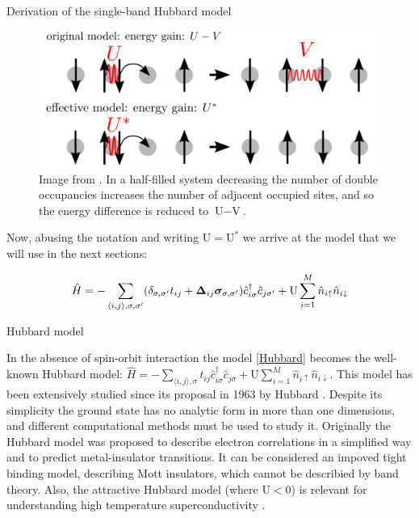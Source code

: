 \begin{section}{Derivation of the single-band Hubbard model}
\begin{figure}
\centering
  \includegraphics[width=0.5\linewidth]{../Figures/non_local_coulomb.png}
  \caption{Image from \cite{Schuler2013}. In a half-filled system decreasing the number of double occupancies increases the number of adjacent occupied sites, and so the energy difference is reduced to $\text{U}-\text{V}$.} 
\label{Fig2.1}
\end{figure}

Now, abusing the notation and writing $\text{U} = \text{U}^*$ we arrive at the model that we will use in the next sections:

\begin{equation}
\label{Hubbard}
\hat{H} = -\sum_{\langle i,j \rangle, \sigma, \sigma'}(\delta_{\sigma, \sigma'} t_{ij} + \boldsymbol{\Delta}_{ij} \boldsymbol{\sigma}_{\sigma, \sigma'})\hat{c}_{i \sigma}^\dagger \hat{c}_{j \sigma'} + \text{U} \sum_{i=1}^M \hat{n}_{i\uparrow}\hat{n}_{i\downarrow}
\end{equation}

\begin{subsection}{Hubbard model}

In the absence of spin-orbit interaction the model \ref{Hubbard} becomes the well-known Hubbard model: $\hat{H} = -\sum_{\langle i,j \rangle, \sigma} t_{ij} \hat{c}_{i \sigma}^\dagger \hat{c}_{j \sigma} + \text{U} \sum_{i=1}^M \hat{n}_{i\uparrow}\hat{n}_{i\downarrow}$. This model has been extensively studied since its proposal in 1963 by Hubbard \cite{Hubbard1963}. Despite its simplicity the ground state has no analytic form in more than one dimensions, and different computational methods must be used to study it. Originally the Hubbard model was proposed to describe electron correlations in a simplified way and to predict metal-insulator transitions. It can be considered an impoved tight binding model, describing Mott insulators, which cannot be describied by band theory. Also, the attractive Hubbard model (where $\text{U} < 0$) is relevant for understanding high temperature superconductivity \cite{Alexandrov1981}.

\end{subsection}

\end{section}

